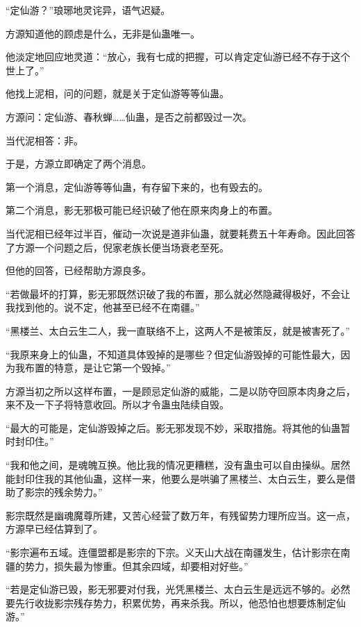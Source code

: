 
\begin{this_body}

“定仙游？”琅琊地灵诧异，语气迟疑。

方源知道他的顾虑是什么，无非是仙蛊唯一。

他淡定地回应地灵道：“放心，我有七成的把握，可以肯定定仙游已经不存于这个世上了。”

他找上泥相，问的问题，就是关于定仙游等等仙蛊。

方源问：定仙游、春秋蝉……仙蛊，是否之前都毁过一次。

当代泥相答：非。

于是，方源立即确定了两个消息。

第一个消息，定仙游等等仙蛊，有存留下来的，也有毁去的。

第二个消息，影无邪极可能已经识破了他在原来肉身上的布置。

当代泥相已经年过半百，催动一次说是道非仙蛊，就要耗费五十年寿命。因此回答了方源一个问题之后，倪家老族长便当场衰老至死。

但他的回答，已经帮助方源良多。

“若做最坏的打算，影无邪既然识破了我的布置，那么就必然隐藏得极好，不会让我找到他的。说不定，他甚至已经不在南疆。”

“黑楼兰、太白云生二人，我一直联络不上，这两人不是被策反，就是被害死了。”

“我原来身上的仙蛊，不知道具体毁掉的是哪些？但定仙游毁掉的可能性最大，因为我布置的特意，是让它第一个毁掉。”

方源当初之所以这样布置，一是顾忌定仙游的威能，二是以防夺回原本肉身之后，来不及一下子将特意收回。所以才令蛊虫陆续自毁。

“最大的可能是，定仙游毁掉之后。影无邪发现不妙，采取措施。将其他的仙蛊暂时封印住。”

“我和他之间，是魂魄互换。他比我的情况更糟糕，没有蛊虫可以自由操纵。居然能封印住我的其他仙蛊，这样一来，他要么是哄骗了黑楼兰、太白云生，要么是借助了影宗的残余势力。”

影宗既然是幽魂魔尊所建，又苦心经营了数万年，有残留势力理所应当。这一点，方源早已经估算到了。

“影宗遍布五域。连僵盟都是影宗的下宗。义天山大战在南疆发生，估计影宗在南疆的势力，损失最为惨重。但其余四域，却要相对好些。”

“若是定仙游已毁，影无邪要对付我，光凭黑楼兰、太白云生是远远不够的。必然要先行收拢影宗残存势力，积累优势，再来杀我。所以，他恐怕也想要炼制定仙游。”


\end{this_body}
